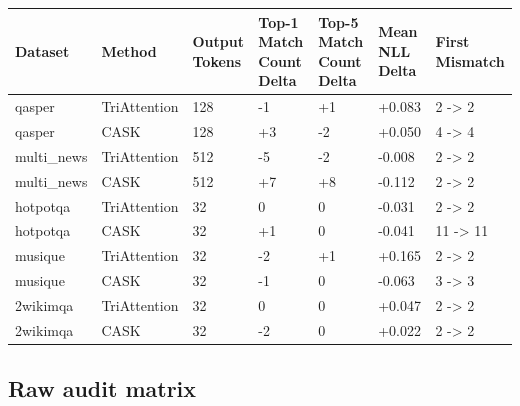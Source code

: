 \begin{table}[H]
\centering
\small
\begin{tabularx}{\textwidth}{YYYYYYY}
\toprule
Dataset & Method & Output Tokens & Top-1 Match Count Delta & Top-5 Match Count Delta & Mean NLL Delta & First Mismatch \\
\midrule
qasper & TriAttention & 128 & -1 & +1 & +0.083 & 2 -> 2 \\
qasper & CASK & 128 & +3 & -2 & +0.050 & 4 -> 4 \\
multi\_news & TriAttention & 512 & -5 & -2 & -0.008 & 2 -> 2 \\
multi\_news & CASK & 512 & +7 & +8 & -0.112 & 2 -> 2 \\
hotpotqa & TriAttention & 32 & 0 & 0 & -0.031 & 2 -> 2 \\
hotpotqa & CASK & 32 & +1 & 0 & -0.041 & 11 -> 11 \\
musique & TriAttention & 32 & -2 & +1 & +0.165 & 2 -> 2 \\
musique & CASK & 32 & -1 & 0 & -0.063 & 3 -> 3 \\
2wikimqa & TriAttention & 32 & 0 & 0 & +0.047 & 2 -> 2 \\
2wikimqa & CASK & 32 & -2 & 0 & +0.022 & 2 -> 2 \\
\bottomrule
\end{tabularx}
\end{table}


\subsection{Raw audit matrix}


